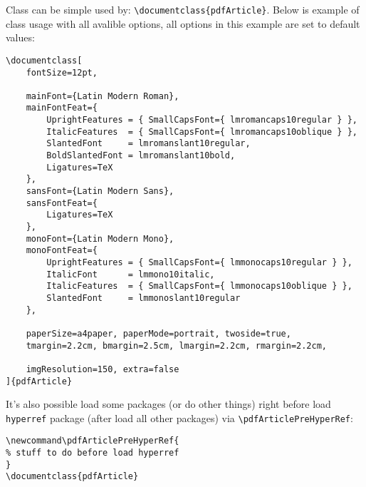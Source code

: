 \documentclass[ fontSize=10pt, ]{pdfArticle}
\begin{document}
\clearpage
Class can be simple used by: \Verb$\documentclass{pdfArticle}$. Below is example of class usage with all avalible options, all options in this example are set to default values:
\begin{Verbatim}[xleftmargin=5mm]
\documentclass[
	fontSize=12pt,
	
	mainFont={Latin Modern Roman},
	mainFontFeat={
		UprightFeatures = { SmallCapsFont={ lmromancaps10regular } },
		ItalicFeatures  = { SmallCapsFont={ lmromancaps10oblique } },
		SlantedFont     = lmromanslant10regular,
		BoldSlantedFont = lmromanslant10bold,
		Ligatures=TeX
	},
	sansFont={Latin Modern Sans},
	sansFontFeat={
		Ligatures=TeX
	},
	monoFont={Latin Modern Mono},
	monoFontFeat={
		UprightFeatures = { SmallCapsFont={ lmmonocaps10regular } },
		ItalicFont      = lmmono10italic,
		ItalicFeatures  = { SmallCapsFont={ lmmonocaps10oblique } },
		SlantedFont     = lmmonoslant10regular
	},
	
	paperSize=a4paper, paperMode=portrait, twoside=true,
	tmargin=2.2cm, bmargin=2.5cm, lmargin=2.2cm, rmargin=2.2cm,
	
	imgResolution=150, extra=false
]{pdfArticle}
\end{Verbatim}

It's also possible load some packages (or do other things) right before load \texttt{hyperref} package (after load all other packages) via \Verb$\pdfArticlePreHyperRef$:
\begin{Verbatim}[xleftmargin=5mm]
\newcommand\pdfArticlePreHyperRef{
% stuff to do before load hyperref
}
\documentclass{pdfArticle}
\end{Verbatim}
\end{document}
